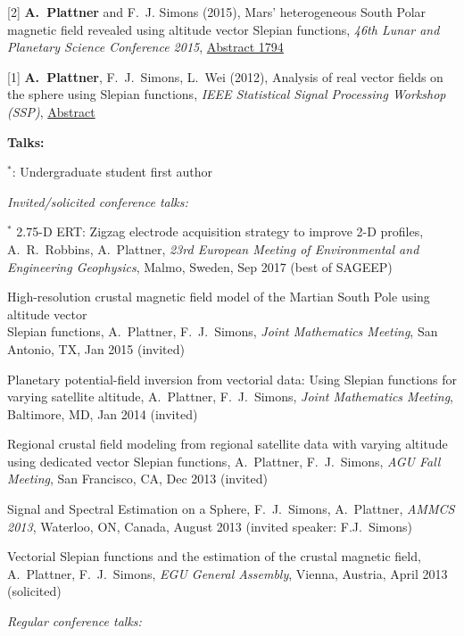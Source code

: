 \documentclass[10pt]{article}
\begin{document}
\spcp
\hspace{-0.5cm}[2] \textbf{A.~Plattner} and F.~J. Simons (2015),
Mars' heterogeneous South Polar magnetic field revealed using altitude vector Slepian functions,
\emph{46th Lunar and Planetary Science Conference 2015},
\href{http://www.hou.usra.edu/meetings/lpsc2015/pdf/1794.pdf}{Abstract 1794}

\spcp
\hspace{-0.5cm}[1] \textbf{A.~Plattner}, F.~J.~Simons, L.~Wei (2012),
Analysis of real vector fields on the sphere using Slepian functions,
\emph{IEEE Statistical Signal Processing Workshop (SSP)},
\href{http://ieeexplore.ieee.org/stamp/stamp.jsp?tp=&arnumber=6319659}{Abstract}


\spc
\textbf{\tsize Talks:}

\spcp
$^*$: Undergraduate student first author

\spcp
\emph{Invited/solicited conference talks:} 

\spcp 
\hspace{-0.4cm} $^*$ 2.75-D ERT: Zigzag electrode acquisition strategy
to improve 2-D profiles,
A.~R.~Robbins, A.~Plattner,
\emph{23rd European Meeting of Environmental and Engineering Geophysics}, Malmo, Sweden, Sep 2017 (best of SAGEEP)

\spcp
High-resolution crustal magnetic field model of the Martian South Pole using altitude vector\\ Slepian functions,
A.~Plattner, F.~J.~Simons,
\emph{Joint Mathematics Meeting}, San Antonio, TX, Jan 2015 (invited)

\spcp
Planetary potential-field inversion from vectorial data: Using Slepian functions for varying satellite altitude,
A.~Plattner, F.~J.~Simons,
\emph{Joint Mathematics Meeting}, Baltimore, MD, Jan 2014 (invited)

\spcp
Regional crustal field modeling from regional satellite data with varying altitude using dedicated vector Slepian functions,
A.~Plattner, F.~J.~Simons,
\emph{AGU Fall Meeting}, San Francisco, CA, Dec 2013 (invited)

\spcp
Signal and Spectral Estimation on a Sphere,
F.~J.~Simons, A.~Plattner,
\emph{AMMCS 2013}, Waterloo, ON, Canada, August 2013 (invited speaker: F.J.~Simons)

\spcp
Vectorial Slepian functions and the estimation of the crustal magnetic field,
A.~Plattner, F.~J.~Simons,
\emph{EGU General Assembly}, Vienna, Austria, April 2013 (solicited)

\spc
\emph{Regular conference talks:}
\end{document}
